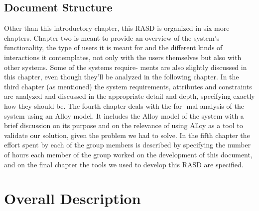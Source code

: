 \documentclass[12pt]{article}
\begin{document}
\subsection{Document Structure}
Other than this introductory chapter, this RASD is organized in six more chapters. Chapter two is meant to provide an overview of the system’s functionality, the type of users it is meant for and the different kinds of interactions it contemplates, not only with the users themselves but also with other systems. Some of the systems require- ments are also slightly discussed in this chapter, even though they’ll be analyzed in the following chapter. In the third chapter (as mentioned) the system requirements, attributes and constraints are analyzed and discussed in the appropriate detail and depth, specifying exactly how they should be. The fourth chapter deals with the for- mal analysis of the system using an Alloy model. It includes the Alloy model of the system with a brief discussion on its purpose and on the relevance of using Alloy as a tool to validate our solution, given the problem we had to solve. In the fifth chapter the effort spent by each of the group members is described by specifying the number of hours each member of the group worked on the development of this document, and on the final chapter the tools we used to develop this RASD are specified.

\section{Overall Description}
\end{document}
